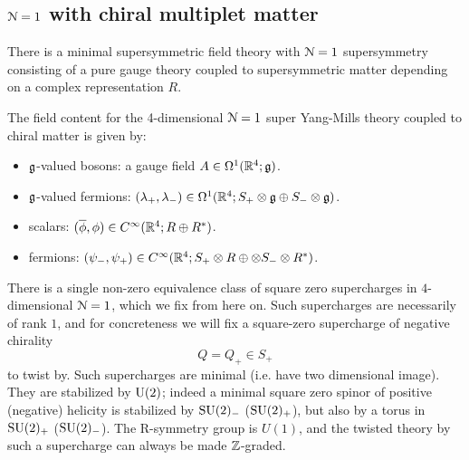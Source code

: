 \documentclass[10pt, oneside]{article}
\begin{document}
\subsection{$\mathcal N=1$ with chiral multiplet matter} 
There is a minimal supersymmetric field theory with $\mathcal N=1$ supersymmetry consisting of a pure gauge theory coupled to supersymmetric matter depending on a complex representation $R$. 


The field content for the 4-dimensional $\mathcal N=1$ super Yang-Mills theory coupled to chiral matter is given by:
\begin{itemize}
\item $\mathfrak g$-valued bosons: a gauge field $A \in \Omega^1(\mathbb R^4 ; \mathfrak g)$.
\item $\mathfrak g$-valued fermions: $(\lambda_+, \lambda_-) \in \Omega^1(\mathbb R^4 ; S_+ \otimes \mathfrak g \oplus S_- \otimes \mathfrak g)$.
\item scalars: $(\overline{\phi}, \phi) \in C^\infty(\mathbb R^4 ; R \oplus R^*)$.
\item fermions: $(\psi_-,\psi_+) \in C^\infty(\mathbb R^4 ; S_+ \otimes R \oplus \otimes S_- \otimes R^*)$.
\end{itemize}

There is a single non-zero equivalence class of square zero supercharges in $4$-dimensional $\mathcal{N} = 1$, which we fix from here on.
Such supercharges are necessarily of rank $1$, and for concreteness we will fix a square-zero supercharge of negative chirality $$Q = Q_+ \in S_+$$ to twist by. 
Such supercharges are minimal (i.e. have two dimensional image).  
They are stabilized by ${\rm U}(2)$; indeed a minimal square zero spinor of positive (negative) helicity is stabilized by $\mathrm{SU}(2)_-$ ($\mathrm{SU}(2)_+$), but also by a torus in $\mathrm{SU}(2)_+$ ($\mathrm{SU}(2)_-$).  
The R-symmetry group is $U(1)$, and the twisted theory by such a supercharge can always be made $\mathbb Z$-graded.
\end{document}
